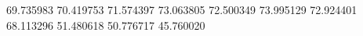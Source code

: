 69.735983
70.419753
71.574397
73.063805
72.500349
73.995129
72.924401
68.113296
51.480618
50.776717
45.760020
